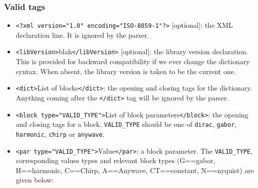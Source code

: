 \documentclass[11pt,a4paper]{article}
\begin{document}
\subsubsection*{Valid tags}
\begin{itemize}


\item \verb+<?xml version="1.0" encoding="ISO-8859-1"?>+ [optional]: the XML
  declaration line. It is ignored by the parser.
  
\item \verb+<libVersion>+blah\verb+</libVersion>+ [optional]: the library
  version declaration. This is provided for backward compatibility if we ever
  change the dictionary syntax. When absent, the library version is taken to be
  the current one.

\item \verb+<dict>+List of blocks\verb+</dict>+: the opening and closing tags
  for the dictionary. Anything coming after the \verb+</dict>+ tag will be
  ignored by the parser.
  
\item \verb+<block type="VALID_TYPE">+List of block parameters\verb+</block>+:
  the opening and closing tags for a block.  \verb+VALID_TYPE+ should be one of
  \verb+dirac+, \verb+gabor+, \verb+harmonic+, \verb+chirp+ or \verb+anywave+.
  
\item \verb+<par type="VALID_TYPE">+Value\verb+</par>+: a block
  parameter. The \verb+VALID_TYPE+, corresponding values types and
  relevant block types (G==gabor, H==harmonic, C==Chirp, A==Anywave,
  CT==constant, N==nyquist) are given below:
\end{itemize}
\end{document}
